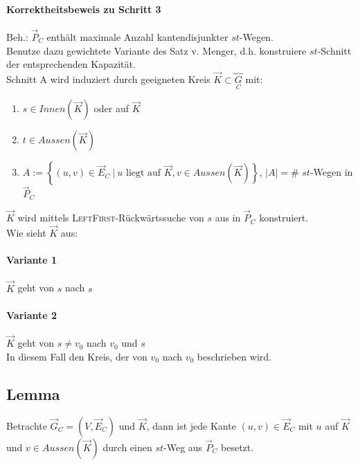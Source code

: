 \documentclass{article}
\newcommand{\set}[2]{\left\lbrace #1~|~#2 \right\rbrace}
\begin{document}
\paragraph{Korrektheitsbeweis zu Schritt 3}
Beh.: $\overrightarrow{P}_C$ enthält maximale Anzahl kantendisjunkter $st$-Wegen.\\
Benutze dazu gewichtete Variante des Satz v. Menger, d.h. konstruiere $st$-Schnitt der entsprechenden Kapazität.\\
Schnitt A wird induziert durch geeigneten Kreis $\overrightarrow{K} \subset \overbrace{G}_C$ mit:
\begin{enumerate}
	\item $s\in Innen(\overrightarrow{K})$ oder auf $\overrightarrow{K}$
	\item $t \in Aussen(\overrightarrow{K})$
	\item $A :=\set{(u,v)\in \overrightarrow{E}_C}{u \text{ liegt auf }\overrightarrow{K}, v \in Aussen(\overrightarrow{K})}$, $|A| = $\# $st$-Wegen in $\overrightarrow{P}_C$
\end{enumerate}

$\overrightarrow{K}$ wird mittels \textsc{LeftFirst}-Rückwärtssuche von $s$ aus in $\overrightarrow{P}_C$ konstruiert.\\
Wie sieht $\overrightarrow{K}$ aus:
\paragraph{Variante 1}
$\overrightarrow{K}$ geht von $s$ nach $s$
\paragraph{Variante 2}
$\overrightarrow{K}$ geht von $s \neq v_0$ nach $v_0$ und $s$\\
In diesem Fall den Kreis, der von $v_0$ nach $v_0$ beschrieben wird.

\subsection{Lemma}
Betrachte $\overrightarrow{G}_C = (V,\overrightarrow{E}_C)$ und $\overrightarrow{K}$, dann ist jede Kante $(u,v) \in \overrightarrow{E}_C$ mit $u$ auf $\overrightarrow{K}$ und $v \in Aussen(\overrightarrow{K})$ durch einen $st$-Weg aus $\overrightarrow{P}_C$ besetzt.
\end{document}
